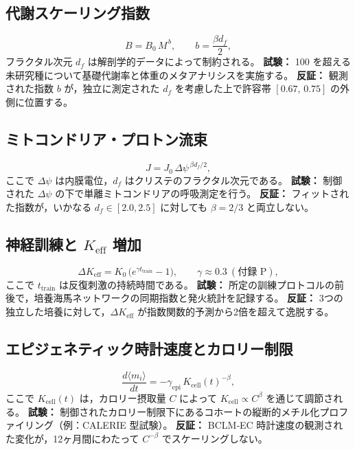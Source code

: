 \documentclass[11pt,a4paper]{article}
\begin{document}
	\subsection{代謝スケーリング指数}
	
	\begin{equation}\label{eq:pred-metab}
		B = B_0\,M^{\,b}, \qquad
		b = \frac{\beta d_f}{2},
	\end{equation}
	フラクタル次元 \(d_f\) は解剖学的データによって制約される。
	\textbf{試験：} 100 を超える未研究種について基礎代謝率と体重のメタアナリシスを実施する。
	\textbf{反証：} 観測された指数 \(b\) が，独立に測定された \(d_f\) を考慮した上で許容帯 \([0.67,\,0.75]\) の外側に位置する。
	
	\subsection{ミトコンドリア・プロトン流束}
	
	\begin{equation}\label{eq:pred-mito}
		J = J_0\,\Delta\psi^{\,\beta d_f/2},
	\end{equation}
	ここで \(\Delta\psi\) は内膜電位，\(d_f\) はクリステのフラクタル次元である。
	\textbf{試験：} 制御された \(\Delta\psi\) の下で単離ミトコンドリアの呼吸測定を行う。
	\textbf{反証：} フィットされた指数が，いかなる \(d_f\in[2.0,2.5]\) に対しても \(\beta=2/3\) と両立しない。
	
	\subsection{神経訓練と \(K_{\mathrm{eff}}\) 増加}
	
	\begin{equation}\label{eq:pred-neural}
		\Delta K_{\mathrm{eff}} = K_0\,
		\bigl(e^{\gamma t_{\mathrm{train}}}-1\bigr),\qquad
		\gamma \approx 0.3\ (\text{付録~P}),
	\end{equation}
	ここで \(t_{\mathrm{train}}\) は反復刺激の持続時間である。
	\textbf{試験：} 所定の訓練プロトコルの前後で，培養海馬ネットワークの同期指数と発火統計を記録する。
	\textbf{反証：} 3つの独立した培養に対して，\(\Delta K_{\mathrm{eff}}\) が指数関数的予測から2倍を超えて逸脱する。
	
	\subsection{エピジェネティック時計速度とカロリー制限}
	
	\begin{equation}\label{eq:pred-epi}
		\frac{d\langle m_i\rangle}{dt} =
		-\gamma_{\mathrm{epi}}\, K_{\mathrm{cell}}(t)^{-\beta},
	\end{equation}
	ここで \(K_{\mathrm{cell}}(t)\) は，カロリー摂取量 \(C\) によって \(K_{\mathrm{cell}} \propto C^{\beta}\) を通じて調節される。
	\textbf{試験：} 制御されたカロリー制限下にあるコホートの縦断的メチル化プロファイリング（例：CALERIE 型試験）。
	\textbf{反証：} BCLM‑EC 時計速度の観測された変化が，12ヶ月間にわたって \(C^{-\beta}\) でスケーリングしない。
	
\end{document}
